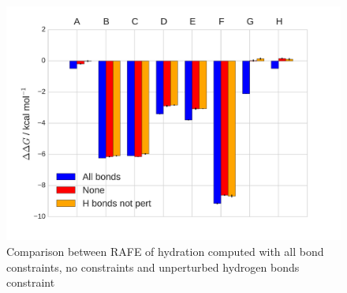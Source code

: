 \documentclass[journal=jctcce,manuscript=suppinfo]{achemso}
\begin{document}
\begin{figure}[ht]
  \includegraphics[width=\textwidth]{figures/SI_sire_constraints.pdf}
  \caption{Comparison between RAFE of hydration computed with all bond constraints, no constraints and unperturbed hydrogen bonds constraint}
  \label{fig:sire_constraints}
\end{figure}
\end{document}

